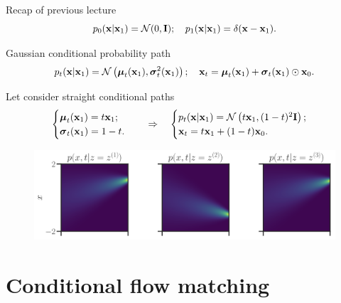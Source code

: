 \begin{frame}{Recap of previous lecture}
	\[
		p_0(\mathbf{x} | \mathbf{x}_1) = \mathcal{N}(0, \mathbf{I}); \quad p_1(\mathbf{x} | \mathbf{x}_1) = \delta(\mathbf{x} - \mathbf{x}_1).
	\]
	
	\begin{block}{Gaussian conditional probability path}
		\vspace{-0.5cm}
		\[
			p_t(\mathbf{x} | \mathbf{x}_1) = \mathcal{N}\left(\boldsymbol{\mu}_t(\mathbf{x}_1), \boldsymbol{\sigma}_t^2(\mathbf{x}_1)\right); \quad \mathbf{x}_t = \boldsymbol{\mu}_t(\mathbf{x}_1) +  \boldsymbol{\sigma}_t(\mathbf{x}_1) \odot \mathbf{x}_0.
		\]
		\vspace{-0.6cm}
	\end{block}
	Let consider straight conditional paths	
	\[
		\begin{cases}
			\boldsymbol{\mu}_t(\mathbf{x}_1) = t \mathbf{x}_1; \\
			\boldsymbol{\sigma}_t(\mathbf{x}_1) = 1 - t.
		\end{cases}
		\quad \Rightarrow \quad 
		\begin{cases}
			p_t(\mathbf{x} | \mathbf{x}_1) = \mathcal{N}\left(t \mathbf{x}_1, (1-t)^2 \mathbf{I}\right); \\
		 	\mathbf{x}_t = t \mathbf{x}_1 + (1 - t) \mathbf{x}_0. 
	 \end{cases}
	\]
	\vspace{-0.3cm}
	\begin{figure}
		\centering
		\includegraphics[width=\linewidth]{figs/conical_paths}
	\end{figure}
\end{frame}
\section{Conditional flow matching}
